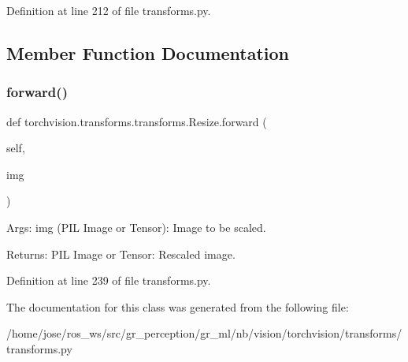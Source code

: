 Definition at line 212 of file transforms.\+py.



\subsection{Member Function Documentation}
\mbox{\label{classtorchvision_1_1transforms_1_1transforms_1_1Resize_ad5279678fd1ecb0279fda99391b93673}} 
\subsubsection{\texorpdfstring{forward()}{forward()}}
{\footnotesize\ttfamily def torchvision.\+transforms.\+transforms.\+Resize.\+forward (\begin{DoxyParamCaption}\item[{}]{self,  }\item[{}]{img }\end{DoxyParamCaption})}

\begin{DoxyVerb}Args:
    img (PIL Image or Tensor): Image to be scaled.

Returns:
    PIL Image or Tensor: Rescaled image.
\end{DoxyVerb}
 

Definition at line 239 of file transforms.\+py.



The documentation for this class was generated from the following file\+:\begin{DoxyCompactItemize}
\item 
/home/jose/ros\+\_\+ws/src/gr\+\_\+perception/gr\+\_\+ml/nb/vision/torchvision/transforms/transforms.\+py\end{DoxyCompactItemize}
